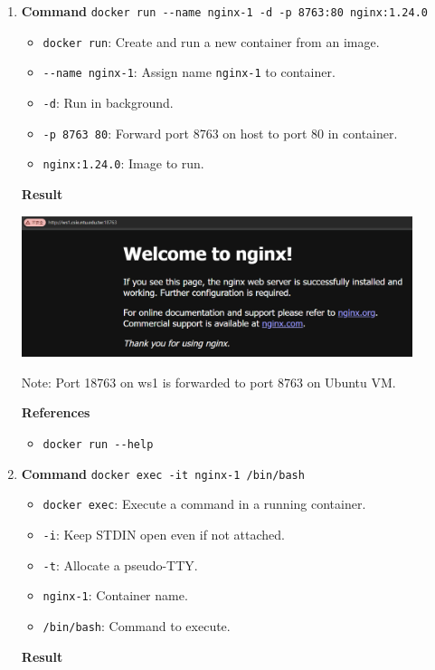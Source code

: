 \documentclass[12pt, a4paper]{article}
\begin{document}
\begin{enumerate}[resume]
    \pagebreak
    \item
    \textbf{Command} \verb|docker run --name nginx-1 -d -p 8763:80 nginx:1.24.0|
    \begin{itemize}
      \item \verb|docker run|: Create and run a new container from an image.
      \item \verb|--name nginx-1|: Assign name \texttt{nginx-1} to container.
      \item \verb|-d|: Run in background.
      \item \verb|-p 8763 80|: Forward port 8763 on host to port 80 in container.
      \item \verb|nginx:1.24.0|: Image to run.
    \end{itemize}

    \textbf{Result}

    \includegraphics[width=0.9\textwidth]{7_nginx.png}

    Note: Port 18763 on ws1 is forwarded to port 8763 on Ubuntu VM.

    \textbf{References}
    \begin{itemize}
      \item \verb|docker run --help|
    \end{itemize}

    \item
    \textbf{Command} \verb|docker exec -it nginx-1 /bin/bash|
    \begin{itemize}
      \item \verb|docker exec|: Execute a command in a running container.
      \item \verb|-i|: Keep STDIN open even if not attached.
      \item \verb|-t|: Allocate a pseudo-TTY.
      \item \verb|nginx-1|: Container name.
      \item \verb|/bin/bash|: Command to execute.
    \end{itemize}

    \textbf{Result}


\end{enumerate}
\end{document}
